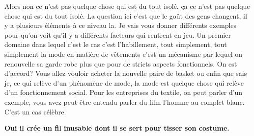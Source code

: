 \begin{small}
Alors non ce n'est pas quelque chose qui est du tout isolé, ça ce n'est pas quelque chose qui est du tout isolé. La question ici c'est que le goût des gens changent, il y a plusieurs éléments à ce niveau la. Je vais vous donner différents exemples pour qu'on voit qu'il y a différents facteurs qui rentrent en jeu. Un premier domaine dans lequel c'est le cas c'est l'habillement, tout simplement, tout simplement la mode en matière de vêtements c'est un mécanisme par lequel on renouvelle sa garde robe plus que pour de stricts aspects fonctionnels. On est d'accord? Vous allez vouloir acheter la nouvelle paire de basket ou enfin que sais je, ce qui relève d'un phénomène de mode, la mode est quelque chose qui relève d'un fonctionnement social. Pour les entreprises du textile, on peut parler d'un exemple, vous avez peut-être entendu parler du film l'homme au complet blanc. C'est un cas célèbre.

\smallbreak\textbf{Oui il crée un fil inusable dont il se sert pour tisser son costume.
}\smallbreak



\end{small}
